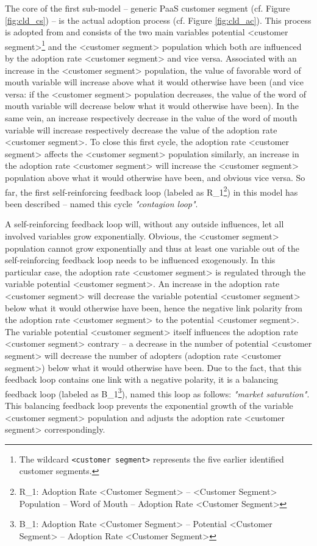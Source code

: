 The core of the first sub-model -- generic \ac{PaaS} customer segment (cf. Figure \ref{fig:cld_cs}) -- is the actual adoption process (cf. Figure \ref{fig:cld_ac}). This process is adopted from \citet[p. 18]{Sterman2001} and consists of the two main variables potential <customer segment>\footnote{The wildcard \texttt{<customer segment>} represents the five earlier identified customer segments.} and the <customer segment> population which both are influenced by the adoption rate <customer segment> and vice versa. Associated with an increase in the <customer segment> population, the value of favorable word of mouth variable will increase above what it would otherwise have been (and vice versa: if the <customer segment> population decreases, the value of the word of mouth variable will decrease below what it would otherwise have been). In the same vein, an increase respectively decrease in the value of the word of mouth variable will increase respectively decrease the value of the adoption rate <customer segment>. To close this first cycle, the adoption rate <customer segment> affects the <customer segment> population similarly, an increase in the adoption rate <customer segment> will increase the <customer segment> population above what it would otherwise have been, and obvious vice versa. So far, the first self-reinforcing feedback loop (labeled as R\_1\footnote{R\_1: Adoption Rate <Customer Segment> -- <Customer Segment> Population -- Word of Mouth -- Adoption Rate <Customer Segment>}) in this model has been described -- \citet[p. 19]{Sterman2001} named this cycle \textit{"contagion loop"}. 

A self-reinforcing feedback loop will, without any outside influences, let all involved variables grow exponentially. Obvious, the <customer segment> population cannot grow exponentially and thus at least one variable out of the self-reinforcing feedback loop needs to be influenced exogenously. In this particular case, the adoption rate <customer segment> is regulated through the variable potential <customer segment>. An increase in the adoption rate <customer segment> will decrease the variable potential <customer segment> below what it would otherwise have been, hence the negative link polarity from the adoption rate <customer segment> to the potential <customer segment>. The variable potential <customer segment> itself influences the adoption rate <customer segment> contrary -- a decrease in the number of potential <customer segment> will decrease the number of adopters (adoption rate <customer segment>) below what it would otherwise have been. Due to the fact, that this feedback loop contains one link with a negative polarity, it is a balancing feedback loop (labeled as B\_1\footnote{B\_1: Adoption Rate <Customer Segment> -- Potential <Customer Segment> -- Adoption Rate <Customer Segment>}), \citet[p. 18]{Sterman2001} named this loop as follows: \textit{"market saturation"}. This balancing feedback loop prevents the exponential growth of the variable <customer segment> population and adjusts the adoption rate <customer segment> correspondingly.

